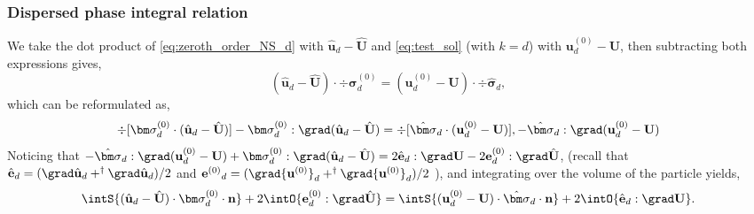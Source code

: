 \subsubsection{Dispersed phase integral relation}

We take the dot product of \ref{eq:zeroth_order_NS_d} with $\hat{\textbf{u}}_d - \hat{\textbf{U}}$ and \ref{eq:test_sol} (with $k=d$) with $\textbf{u}_d^{(0)} -\textbf{U}$, then subtracting both expressions gives, 
\begin{equation*}
    (\hat{\textbf{u}}_d - \hat{\textbf{U}})\cdot \div\bm\sigma_d^{(0)}
    =
    (\textbf{u}_d^{(0)} - \textbf{U}) \cdot \div \hat{\bm\sigma}_d, 
\end{equation*}
which can be reformulated as, 
\begin{equation*}
    \div [\bm\sigma_d^{(0)} \cdot (\hat{\textbf{u}}_d - \hat{\textbf{U}})]
    - \bm\sigma_d^{(0)} : \grad (\hat{\textbf{u}}_d - \hat{\textbf{U}})
    =
    \div [\hat{\bm\sigma}_d \cdot (\textbf{u}_d^{(0)} - \textbf{U})], 
    - \hat{\bm\sigma}_d : \grad ({\textbf{u}}_d^{(0)} - \textbf{U})
\end{equation*}
Noticing that $- \hat{\bm\sigma}_d : \grad ({\textbf{u}}_d^{(0)} - \textbf{U}) + \bm\sigma_d^{(0)} : \grad (\hat{\textbf{u}}_d - \hat{\textbf{U}}) = 2 \hat{\textbf{e}}_d : \grad \textbf{U} - 2 \textbf{e}_d^{(0)} : \grad \hat{\textbf{U}}$, 
(recall that $\hat{\textbf{e}}_d = (\grad \hat{\textbf{u}}_d + ^\dagger \grad \hat{\textbf{u}}_d)/2$ and ${\textbf{e}^{(0)}}_d = (\grad {\textbf{u}^{(0)}}_d + ^\dagger \grad {\textbf{u}^{(0)}}_d)/2$ ), and integrating over the volume of the particle yields, 
\begin{equation}
    \intS{(\hat{\textbf{u}}_d - \hat{\textbf{U}})\cdot \bm\sigma_d^{(0)} \cdot \textbf{n}}
    + 2\intO{\textbf{e}_d^{(0)} : \grad \hat{\textbf{U}}}
    =
    \intS{(\textbf{u}_d^{(0)} - \textbf{U}) \cdot  \hat{\bm\sigma}_d\cdot \textbf{n} }
    + 2\intO{\hat{\textbf{e}}_d : \grad \textbf{U}}. 
    \label{eq:reciprocal_d}
\end{equation}





